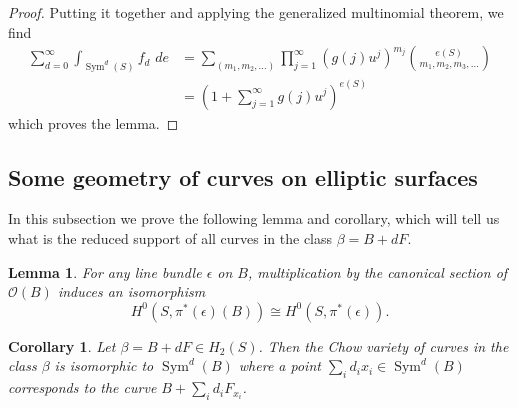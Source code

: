 \documentclass{amsart}
\newtheorem{lemma}[theorem]{Lemma}
\newtheorem{corollary}[theorem]{Corollary}
\theoremstyle{definition}
\renewcommand{\O}{\mathcal{O}}
\newcommand{\Sym}{\operatorname{Sym}}
\begin{document}
\begin{proof}
Putting it together and applying the generalized multinomial theorem,
we find
\begin{align*}
\sum _{d=0}^{\infty } \int _{\Sym ^{d} (S)}f_{d}\,\,de & = \sum _{(m_{1},m_{2},\dots )} \prod _{j=1}^{\infty } \left(g (j) u^{j} \right)^{m_{j}} \binom{e (S)}{m_{1},m_{2},m_{3},\dots }\\
&=\left(1+\sum _{j=1}^{\infty }g (j) u^{j} \right)^{e (S)}
\end{align*}
which proves the lemma.   
\end{proof}

\subsection{Some geometry of curves on elliptic surfaces}\label{subsec: geometry of curves on elliptic surfaces}

In this subsection we prove the following lemma and corollary, which will tell us what is the reduced support of all curves in the class $\beta =B+dF$.

\begin{lemma}\label{lem: H0 (pi* (D) (B))=H0 (pi* (D))}
For any line bundle $\epsilon $ on $B$, multiplication by the
canonical section of $\O (B)$ induces an isomorphism
\[
H^{0} (S,\pi ^{*} (\epsilon ) (B)) \cong H^{0} (S,\pi ^{*} (\epsilon )).
\]
\end{lemma}

\begin{corollary} \label{cor: chow(beta) = sym (B)}
Let $\beta = B+dF \in H_{2} (S)$. Then the Chow variety of curves in
the class $\beta $ is isomorphic to $\Sym ^{d} (B)$ where a point
$\sum _{i}d_{i} x_{i}\in \Sym ^{d} (B)$ corresponds to the curve
$B+\sum _{i}d_{i} F_{x_{i}}$.
\end{corollary}
\end{document}
